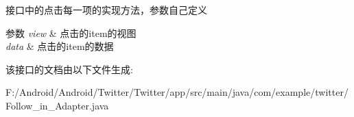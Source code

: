 接口中的点击每一项的实现方法，参数自己定义


\begin{DoxyParams}{参数}
{\em view} & 点击的item的视图 \\
\hline
{\em data} & 点击的item的数据 \\
\hline
\end{DoxyParams}


该接口的文档由以下文件生成\+:\begin{DoxyCompactItemize}
\item 
F\+:/\+Android/\+Android/\+Twitter/\+Twitter/app/src/main/java/com/example/twitter/Follow\+\_\+in\+\_\+\+Adapter.\+java\end{DoxyCompactItemize}

